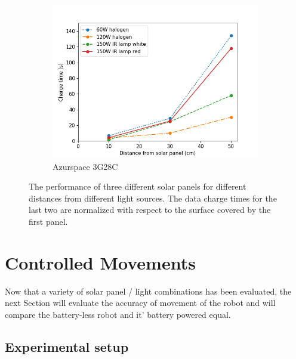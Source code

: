 \begin{figure}
\begin{subfigure}[b]{0.62\textwidth}
		\includegraphics[width=\textwidth]{pics/light_experiment_figure3.png}
		\caption{Azurspace 3G28C}
		\label{fig:light_exp3}
	\end{subfigure}
	\caption{The performance of three different solar panels for different distances from different light sources. The data charge times for the last two are normalized with respect to the surface covered by the first panel.}
\end{figure}

\newpage

\section{Controlled Movements}
\label{sec:controlled_movements}




Now that a variety of solar panel / light combinations has been evaluated, the next Section will evaluate the accuracy of movement of the robot and will compare the battery-less robot and it' battery powered equal.

\subsection{Experimental setup}

